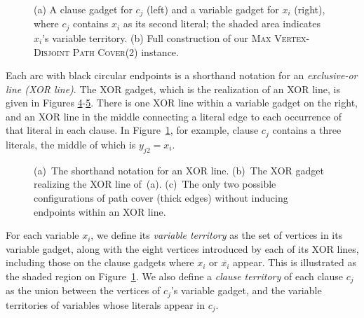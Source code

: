 \documentclass[11pt]{article}
\begin{document}
\begin{figure}
    \centering
    \begin{subfigure}[b]{0.65\textwidth}
    	\centering
        
        \caption{}
        \label{fig:gadgets}
    \end{subfigure}
%
    \begin{subfigure}[b]{0.3\textwidth}
    	\centering
        
        \caption{}
        \label{fig:connect}
    \end{subfigure}
    \caption{(a) A clause gadget for $c_j$ (left) and a variable gadget for $x_i$ (right), where $c_j$ contains $x_i$ as its second literal; the shaded area indicates $x_i$'s variable territory. (b) Full construction of our \textsc{Max Vertex-Disjoint Path Cover(2)} instance.}
\end{figure}

Each arc with black circular endpoints is a shorthand notation for an \emph{exclusive-or line (XOR line)}. The XOR gadget, which is the realization of an XOR line, is given in Figures \ref{fig:xor-short}-\ref{fig:xor-real}. There is one XOR line within a variable gadget on the right, and an XOR line in the middle connecting a literal edge to each occurrence of that literal in each clause. In Figure~\ref{fig:gadgets}, for example, clause $c_j$ contains a three literals, the middle of which is $y_{j2} = x_i$.

\begin{figure}
    \centering
    \begin{subfigure}[b]{0.25\textwidth}
    	\centering
        
        \caption{}
        \label{fig:xor-short}
    \end{subfigure}
%
    \begin{subfigure}[b]{0.25\textwidth}
    	\centering
        
        \caption{}
        \label{fig:xor-real}
    \end{subfigure}
%
    \begin{subfigure}[b]{0.4\textwidth}
    	\centering
        
        \caption{}
        \label{fig:xor-noendpts}
    \end{subfigure}
    \caption{(a)~The shorthand notation for an XOR line. (b)~The XOR gadget realizing the XOR line of~(a). (c)~The only two possible configurations of path cover (thick edges) without inducing endpoints within an XOR line.}
\end{figure}

For each variable $x_i$, we define its \emph{variable territory} as the set of vertices in its variable gadget, along with the eight vertices introduced by each of its XOR lines, including those on the clause gadgets where $x_i$ or $\overline{x_i}$ appear. This is illustrated as the shaded region on Figure~\ref{fig:gadgets}. We also define a \emph{clause territory} of each clause $c_j$ as the union between the vertices of $c_j$'s variable gadget, and the variable territories of variables whose literals appear in $c_j$.
\end{document}
